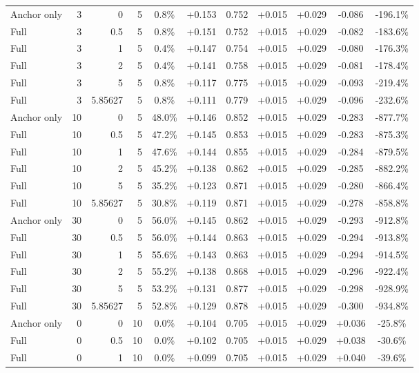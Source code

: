 \begin{table}[htbp]
\begin{tabular}{lrrrccccccc}
Anchor only & 3 & 0 & 5 & 0.8\% & +0.153 & 0.752 & +0.015 & +0.029 & -0.086 & -196.1\% \\
Full & 3 & 0.5 & 5 & 0.8\% & +0.151 & 0.752 & +0.015 & +0.029 & -0.082 & -183.6\% \\
Full & 3 & 1 & 5 & 0.4\% & +0.147 & 0.754 & +0.015 & +0.029 & -0.080 & -176.3\% \\
Full & 3 & 2 & 5 & 0.4\% & +0.141 & 0.758 & +0.015 & +0.029 & -0.081 & -178.4\% \\
Full & 3 & 5 & 5 & 0.8\% & +0.117 & 0.775 & +0.015 & +0.029 & -0.093 & -219.4\% \\
Full & 3 & 5.85627 & 5 & 0.8\% & +0.111 & 0.779 & +0.015 & +0.029 & -0.096 & -232.6\% \\
Anchor only & 10 & 0 & 5 & 48.0\% & +0.146 & 0.852 & +0.015 & +0.029 & -0.283 & -877.7\% \\
Full & 10 & 0.5 & 5 & 47.2\% & +0.145 & 0.853 & +0.015 & +0.029 & -0.283 & -875.3\% \\
Full & 10 & 1 & 5 & 47.6\% & +0.144 & 0.855 & +0.015 & +0.029 & -0.284 & -879.5\% \\
Full & 10 & 2 & 5 & 45.2\% & +0.138 & 0.862 & +0.015 & +0.029 & -0.285 & -882.2\% \\
Full & 10 & 5 & 5 & 35.2\% & +0.123 & 0.871 & +0.015 & +0.029 & -0.280 & -866.4\% \\
Full & 10 & 5.85627 & 5 & 30.8\% & +0.119 & 0.871 & +0.015 & +0.029 & -0.278 & -858.8\% \\
Anchor only & 30 & 0 & 5 & 56.0\% & +0.145 & 0.862 & +0.015 & +0.029 & -0.293 & -912.8\% \\
Full & 30 & 0.5 & 5 & 56.0\% & +0.144 & 0.863 & +0.015 & +0.029 & -0.294 & -913.8\% \\
Full & 30 & 1 & 5 & 55.6\% & +0.143 & 0.863 & +0.015 & +0.029 & -0.294 & -914.5\% \\
Full & 30 & 2 & 5 & 55.2\% & +0.138 & 0.868 & +0.015 & +0.029 & -0.296 & -922.4\% \\
Full & 30 & 5 & 5 & 53.2\% & +0.131 & 0.877 & +0.015 & +0.029 & -0.298 & -928.9\% \\
Full & 30 & 5.85627 & 5 & 52.8\% & +0.129 & 0.878 & +0.015 & +0.029 & -0.300 & -934.8\% \\
Anchor only & 0 & 0 & 10 & 0.0\% & +0.104 & 0.705 & +0.015 & +0.029 & +0.036 & -25.8\% \\
Full & 0 & 0.5 & 10 & 0.0\% & +0.102 & 0.705 & +0.015 & +0.029 & +0.038 & -30.6\% \\
Full & 0 & 1 & 10 & 0.0\% & +0.099 & 0.705 & +0.015 & +0.029 & +0.040 & -39.6\% \\

\end{tabular}
\end{table}

